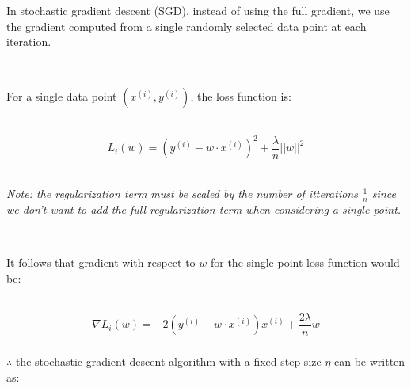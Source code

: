 \documentclass{article}
\begin{document}
\parbox{\textwidth}{
In stochastic gradient descent (SGD), instead of using the full gradient, we use the gradient computed from a single randomly selected data point at each iteration.
}\\

\parbox{\textwidth}{
For a single data point $(x^{(i)}, y^{(i)})$, the loss function is:
}\\

$$L_i(w) = (y^{(i)}-w\cdot x^{(i)})^{2}+\frac{\lambda}{n}||w||^{2}$$\\

\parbox{\textwidth}{
\textit{Note: the regularization term must be scaled by the number of itterations $\frac{1}{n}$ since we don't want to add the full regularization term when considering a single point.}
}\\

\parbox{\textwidth}{
It follows that gradient with respect to $w$ for the single point loss function would be:
}\\

$$
\nabla L_i(w) = -2(y^{(i)}-w\cdot x^{(i)})x^{(i)} + \frac{2\lambda}{n} w
$$

\subsubsection*{\normalfont}{$\therefore$ the stochastic gradient descent algorithm with a fixed step size $\eta$ can be written as:
}\\

\noindent{}
\end{document}
